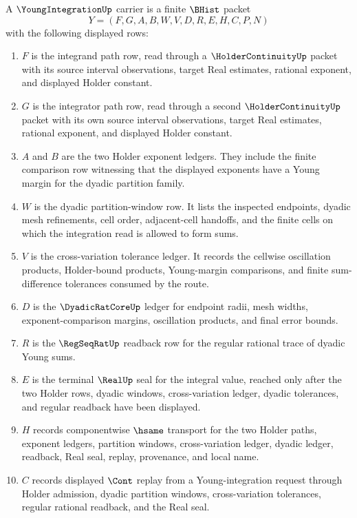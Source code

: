 \begin{definition}
\label{def:young-integration-finite-partition-carrier}
A $\YoungIntegrationUp$ carrier is a finite $\BHist$ packet
$$
Y=(F,G,A,B,W,V,D,R,E,H,C,P,N)
$$
with the following displayed rows:
\begin{enumerate}
\item $F$ is the integrand path row, read through a $\HolderContinuityUp$ packet with its source interval observations, target Real estimates, rational exponent, and displayed Holder constant.
\item $G$ is the integrator path row, read through a second $\HolderContinuityUp$ packet with its own source interval observations, target Real estimates, rational exponent, and displayed Holder constant.
\item $A$ and $B$ are the two Holder exponent ledgers. They include the finite comparison row witnessing that the displayed exponents have a Young margin for the dyadic partition family.
\item $W$ is the dyadic partition-window row. It lists the inspected endpoints, dyadic mesh refinements, cell order, adjacent-cell handoffs, and the finite cells on which the integration read is allowed to form sums.
\item $V$ is the cross-variation tolerance ledger. It records the cellwise oscillation products, Holder-bound products, Young-margin comparisons, and finite sum-difference tolerances consumed by the route.
\item $D$ is the $\DyadicRatCoreUp$ ledger for endpoint radii, mesh widths, exponent-comparison margins, oscillation products, and final error bounds.
\item $R$ is the $\RegSeqRatUp$ readback row for the regular rational trace of dyadic Young sums.
\item $E$ is the terminal $\RealUp$ seal for the integral value, reached only after the two Holder rows, dyadic windows, cross-variation ledger, dyadic tolerances, and regular readback have been displayed.
\item $H$ records componentwise $\hsame$ transport for the two Holder paths, exponent ledgers, partition windows, cross-variation ledger, dyadic ledger, readback, Real seal, replay, provenance, and local name.
\item $C$ records displayed $\Cont$ replay from a Young-integration request through Holder admission, dyadic partition windows, cross-variation tolerances, regular rational readback, and the Real seal.

\end{enumerate}
\end{definition}
